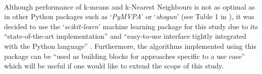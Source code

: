 \paragraph{ }Although performance of k-means and k-Nearest Neighbours is not as optimal as in other Python packages such as `\textit{PyMVPA}' \cite{PyMVPA} or `\textit{shogun}' \cite{Shogun} (see Table 1 in \cite{Pedregosa2011}), it was decided to use the `\textit{scikit-learn}' machine learning package for this study due to its ``state-of-the-art implementation'' and ``easy-to-use interface tightly integrated with the Python language'' \cite{Pedregosa2011}. Furthermore, the algorithms implemented using this package can be ``used as building blocks for approaches specific to a use case'' \cite{Pedregosa2011} which will be useful if one would like to extend the scope of this study.